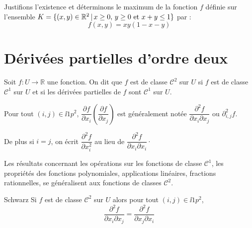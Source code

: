 \documentclass[french,11pt,twoside]{VcCours}
\begin{document}
\medskip

\begin{Exemple}{} Justifions l'existence et déterminons le maximum de la fonction $f$ définie sur l'ensemble $K=\lbrace (x,y) \in \mathbb{R}^2  \, \vert \, x \geq 0, \,  y \geq 0 \hbox{ et } x+y \leq 1\rbrace$ par : 
  \[
  f(x,y) = xy(1-x-y)
  \]





  
  \vspace*{10cm}
\end{Exemple}


\section{Dérivées partielles d'ordre deux}

\begin{Definition}{} Soit $f : U \rightarrow \mathbb{R}$ une fonction. On dit que $f$ est de classe $\mathcal{C}^2$ sur $U$ si $f$ est de classe $\mathcal{C}^1$ sur $U$ et si les dérivées partielles de $f$ sont $\mathcal{C}^1$ sur $U$.
\end{Definition}

Pour tout $(i,j) \in \ii{1}{p}^2$, $\dfrac{\partial f}{\partial x_i} \left( \dfrac{\partial f}{\partial x_j} \right)$ est généralement notée $\dfrac{\partial^2 f}{\partial x_i \partial x_j}$ ou $\partial^2_{i,j} f$.

De plus si $i=j$, on écrit $\dfrac{\partial^2 f}{\partial x_i^2}$ au lieu de $\dfrac{\partial^2 f}{\partial x_i \partial x_i}\cdot$

\medskip


\begin{Remarque}{} Les résultats concernant les opérations sur les fonctions de classe $\mathcal{C}^1$, les propriétés des fonctions polynomiales, applications linéaires, fractions rationnelles, se généralisent aux fonctions de classes $\mathcal{C}^2$.
\end{Remarque}

\begin{Theoreme}{Schwarz}
Si $f$ est de classe $\mathcal{C}^2$ sur $U$ alors pour tout $(i,j) \in \ii{1}{p}^2$,
$$ \dfrac{\partial^2 f}{\partial x_i \partial x_j} = \dfrac{\partial^2 f}{\partial x_j \partial x_i}$$
\end{Theoreme}
\end{document}
